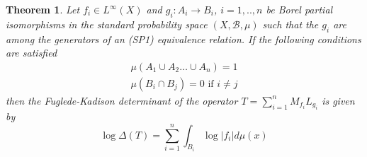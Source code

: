 \documentclass[12pt]{amsart}
\newtheorem{teo}{Theorem}[section]
\numberwithin{equation}{section}
\begin{document}
\begin{teo}\label{r2}
Let $f_i\in L^{\infty}(X)$ and $g_i:A_i\rightarrow B_i$, $i=1,..,n$ be Borel partial isomorphisms in the standard probability space  $(X,\mathcal{B}, \mu)$ such that the $g_i$ are among the generators of an (SP1) equivalence relation.
If the following conditions are satisfied
\begin{align}\label{s1}
\mu(A_1\cup A_2\ldots\cup A_n)=1
\end{align}
\begin{align}\label{s2}
\mu(B_i\cap B_j)=0\mbox{ if } i\neq j
\end{align}
then the Fuglede-Kadison determinant of the operator $T=\sum_{i=1}^n M_{f_i}L_{g_i}$ is given by
\begin{equation}\label{detr2}
\log \Delta(T) = \sum_{i=1}^{n}\int_{B_i} \log |f_{i}| d\mu(x)
\end{equation}

\end{teo}
\end{document}
